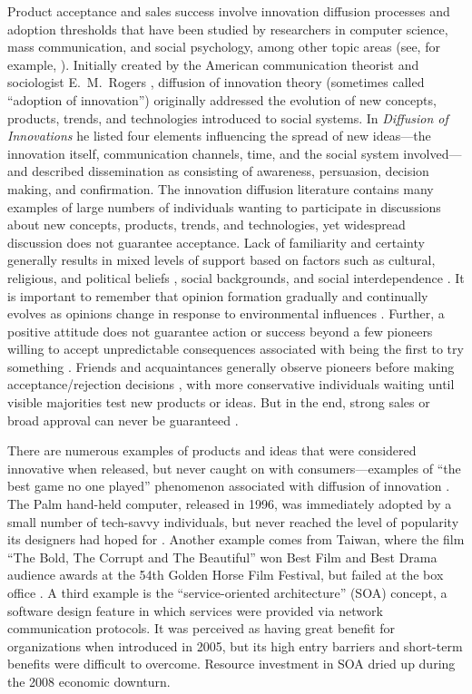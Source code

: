 \documentclass[10pt,letterpaper]{article}
\begin{document}
Product acceptance and sales success involve innovation diffusion processes and adoption thresholds that have been studied by researchers in computer science, mass communication, and social psychology, among other topic areas (see, for example, \cite{Ghaderi2014,Karimi2013,Rogers2003,He2021,Zhang2022}). Initially created by the American communication theorist and sociologist E.~M.~Rogers \cite{Rogers1962}, diffusion of innovation theory (sometimes called ``adoption of innovation'') originally addressed the evolution of new concepts, products, trends, and technologies introduced to social systems. In \textit{Diffusion of Innovations} \cite{Rogers2003} he listed four elements influencing the spread of new ideas---the innovation itself, communication channels, time, and the social system involved---and described dissemination as consisting of awareness, persuasion, decision making, and confirmation. The innovation diffusion literature contains many examples of large numbers of individuals wanting to participate in discussions about new concepts, products, trends, and technologies, yet widespread discussion does not guarantee acceptance. Lack of familiarity and certainty generally results in mixed levels of support based on factors such as cultural, religious, and political beliefs \cite{Peres2010,Rogers2003}, social backgrounds, and social interdependence \cite{Durlauf2001,Etesami2015,Luo2015}. It is important to remember that opinion formation gradually and continually evolves as opinions change in response to environmental influences \cite{Buechel2015,Chacoma2015,Kan2023}. Further, a positive attitude does not guarantee action or success beyond a few pioneers willing to accept unpredictable consequences associated with being the first to try something \cite{Rogers2003,Valente1996}. Friends and acquaintances generally observe pioneers before making acceptance/rejection decisions \cite{Centola2018,Granovetter1986}, with more conservative individuals waiting until visible majorities test new products or ideas. But in the end, strong sales or broad approval can never be guaranteed \cite{Rogers2003}.

There are numerous examples of products and ideas that were considered innovative when released, but never caught on with consumers---examples of ``the best game no one played'' phenomenon associated with diffusion of innovation \cite{Gong2020}. The Palm hand-held computer, released in 1996, was immediately adopted by a small number of tech-savvy individuals, but never reached the level of popularity its designers had hoped for \cite{Zheng2006}. Another example comes from Taiwan, where the film ``The Bold, The Corrupt and The Beautiful'' won Best Film and Best Drama audience awards at the 54th Golden Horse Film Festival, but failed at the box office \cite{DeVany2001}. A third example is the ``service-oriented architecture'' (SOA) concept, a software design feature in which services were provided via network communication protocols. It was perceived as having great benefit for organizations when introduced in 2005, but its high entry barriers and short-term benefits were difficult to overcome. Resource investment in SOA dried up during the 2008 economic downturn.
\end{document}
